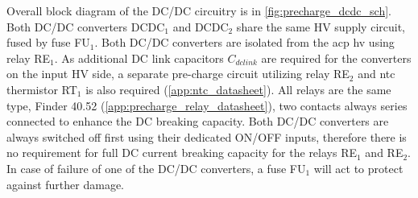 Overall block diagram of the DC/DC circuitry is in \ref{fig:precharge_dcdc_sch}. Both DC/DC converters DCDC$_1$ and DCDC$_2$ share the same HV supply circuit, fused by fuse FU$_1$. Both DC/DC converters are isolated from the \gls{acp} \gls{hv} using relay RE$_1$. As additional DC link capacitors $C_{dclink}$ are required for the converters on the input HV side, a separate pre-charge circuit utilizing relay RE$_2$ and \gls{ntc} thermistor RT$_1$ is also required (\ref{app:ntc_datasheet}). 
All relays are the same type, Finder 40.52 (\ref{app:precharge_relay_datasheet}), two contacts always series connected to enhance the DC breaking capacity. Both DC/DC converters are always switched off first using their dedicated ON/OFF inputs, therefore there is no requirement for full DC current breaking capacity for the relays RE$_1$ and RE$_2$. In case of failure of one of the DC/DC converters, a fuse FU$_1$ will act to protect against further damage. 

